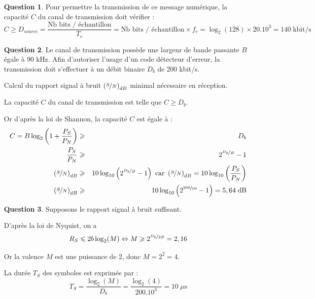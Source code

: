 \documentclass[11pt,english,french]{scrreprt}
\theoremstyle{remark}
\theoremstyle{definition}
\newtheorem{ques}{Question}[section]
\begin{document}
\begin{ques}
	Pour permettre la transmission de ce message numérique, la capacité $C$ du canal de transmission doit vérifier :\[C\geqslant D_{source} = \frac{\textrm{Nb bits / échantillon}}{T_e} = \textrm{Nb bits / échantillon} \times f_e = \log_2(128)\times 20.10^3 = 140\;\textrm{kbit/s}\]
\end{ques}

\begin{ques}
	Le canal de transmission possède une largeur de bande passante $B$ égale à 90 kHz. Afin d’autoriser l’usage d’un code détecteur d’erreur, la transmission doit s’effectuer à un débit binaire $D_b$ de 200 kbit/s.
	
	Calcul du rapport signal à bruit $\left(\nicefrac{S}{N}\right)_{dB}$ minimal nécessaire en réception.
	
	La capacité $C$ du canal de transmission est telle que $C\geqslant D_b$.
	
	Or d'après la loi de Shannon, la capacité $C$ est égale à :
	\begin{eqnarray*}
	C=B\log_{2}\left(1+\frac{P_{S}}{P_{N}}\right) & \geqslant & D_{b}\\
	\frac{P_{S}}{P_{N}} & \geqslant & 2^{\nicefrac{D_{b}}{B}}-1\\
	\left(\nicefrac{S}{N}\right)_{dB} & \geqslant & 10\log_{10}\left(2^{\nicefrac{D_{b}}{B}}-1\right)\textrm{ car }\left(\nicefrac{S}{N}\right)_{dB}=10\log_{10}\left(\frac{P_{S}}{P_{N}}\right)\\
	\left(\nicefrac{S}{N}\right)_{dB} & \geqslant & 10\log_{10}\left(2^{\nicefrac{200}{90}}-1\right)=5,64\;\textrm{dB}\end{eqnarray*}
\end{ques}

\begin{ques}
	Supposons le rapport signal à bruit suffisant. 
	
	D'après la loi de Nyquist, on a \[R_S \leqslant 2b\log_2(M)\Leftrightarrow M\geqslant 2^{\nicefrac{D_b}{2B}}=2,16\]
	
	Or la valence $M$ est une puissance de 2, donc $M=2^2=4$.
	
	La durée $T_S$ des symboles est exprimée par :\[T_S=\frac{\log_2(M)}{D_b}=\frac{\log_2(4)}{200.10^3}=10\;\mu\textrm{s}\]
\end{ques}
\end{document}
